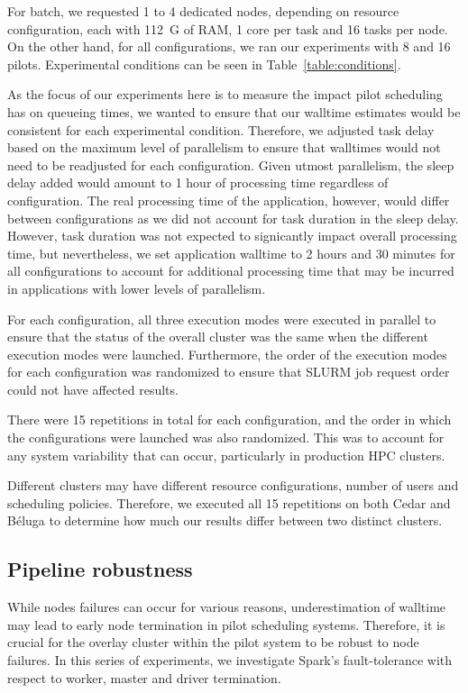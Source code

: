 \documentclass{IEEEtran}
\begin{document}
       For batch, we requested 1 to 4 dedicated nodes, depending on resource 
       configuration, each with 112~G of RAM, 1 core per task and 16 tasks per 
       node. On the other hand, for all configurations, we ran our experiments
       with 8 and 16 pilots. Experimental conditions can be seen in Table~\ref{table:conditions}.

       As the focus of our experiments here is to measure the impact pilot scheduling
       has on queueing times, we wanted to ensure that our walltime estimates would
       be consistent for each experimental condition. Therefore, we adjusted task 
       delay based on the maximum level of parallelism to ensure that walltimes would
       not need to be readjusted for each configuration. Given utmost parallelism,
       the sleep delay added would amount to 1 hour of processing time regardless
       of configuration. The real processing time of the application, however, 
       would differ between configurations as we did not account for task duration
       in the sleep delay. However, task duration was not expected to signicantly impact
       overall processing time, but nevertheless, we set application walltime to 
       2 hours and 30 minutes for all configurations to account for additional
       processing time that may be incurred in applications with lower levels of 
       parallelism.

       For each configuration, all three execution modes were executed in parallel
       to ensure that the status of the overall cluster was the same when the 
       different execution modes were launched. Furthermore, the order of the execution modes
       for each configuration was randomized to ensure that SLURM job request
       order could not have affected results. 

       There were 15 repetitions in total for each configuration, and the order
       in which the configurations were launched was also randomized. This was to 
       account for any system variability that can occur, particularly in production
       HPC clusters. 

       Different clusters may have different resource configurations, number of 
       users and scheduling policies. Therefore, we executed all 15 repetitions on
       both Cedar and B\'eluga to determine how much our results differ between
       two distinct clusters.

    \subsection{Pipeline robustness}
        While nodes failures can occur for various reasons, underestimation of 
        walltime may lead to early node termination in pilot scheduling systems.
        Therefore, it is crucial for the overlay cluster within the pilot system
        to be robust to node failures. In this series of experiments, we investigate
        Spark's fault-tolerance with respect to worker, master and driver termination.
\end{document}
